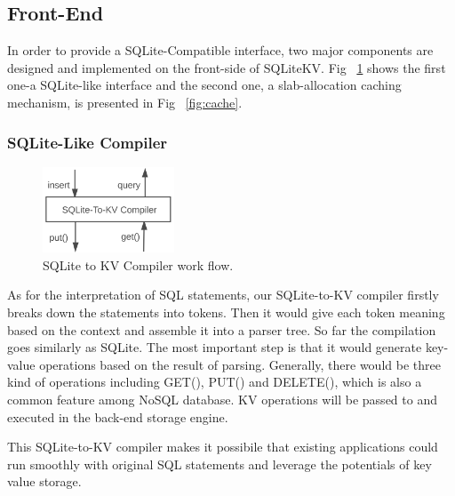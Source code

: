 \subsection{Front-End}
	In order to provide a SQLite-Compatible interface, two major components are designed and implemented on the front-side of SQLiteKV. Fig ~\ref{fig:SQLite2KVCompiler} shows the first one-a SQLite-like interface and the second one, a slab-allocation caching mechanism, is presented in Fig ~\ref{fig:cache}.
	\subsubsection{SQLite-Like Compiler}
	\begin{figure}[h]
		\centering
		\includegraphics[width=0.35\textwidth]{pic/SQLite2KV.png}
		\caption{SQLite to KV Compiler work flow.}
		\label{fig:SQLite2KVCompiler}
		\centering
	\end{figure}
 	As for the interpretation of SQL statements, our SQLite-to-KV compiler firstly breaks down the statements into tokens. Then it would give each token meaning based on the context and assemble it into a parser tree. So far the compilation goes similarly as SQLite. The most important step is that it would generate key-value operations based on the result of parsing. Generally, there would be three kind of operations including GET(), PUT()  and DELETE(), which is also a common feature among NoSQL database. KV operations will be passed to and executed in the back-end storage engine.
	
	This SQLite-to-KV compiler makes it possibile that existing applications could run smoothly with original SQL statements and leverage the potentials of key value storage.
	
